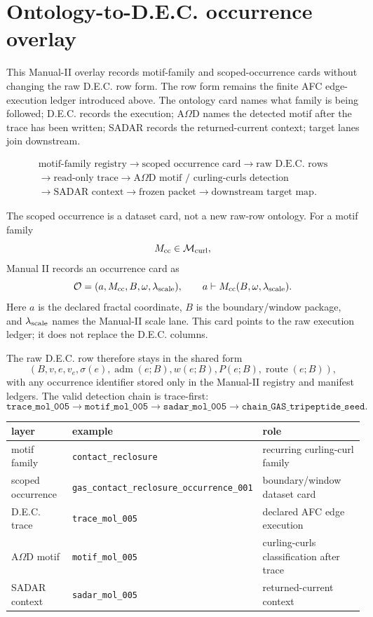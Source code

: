 
\section{Ontology-to-D.E.C. occurrence overlay}

This Manual-II overlay records motif-family and scoped-occurrence cards without changing the raw D.E.C. row form. The row form remains the finite AFC edge-execution ledger introduced above. The ontology card names what family is being followed; D.E.C. records the execution; A$\Omega$D names the detected motif after the trace has been written; SADAR records the returned-current context; target lanes join downstream.

\[
\begin{array}{c}
\text{motif-family registry}\to\text{scoped occurrence card}\to\text{raw D.E.C. rows}\\[0.25em]
\to\text{read-only trace}\to\text{A$\Omega$D motif / curling-curls detection}\\[0.25em]
\to\text{SADAR context}\to\text{frozen packet}\to\text{downstream target map}.
\end{array}
\]

The scoped occurrence is a dataset card, not a new raw-row ontology. For a motif family
\[
M_{\rm cc}\in\mathcal M_{\rm curl},
\]
Manual II records an occurrence card as
\[
\mathcal O=(a,M_{\rm cc},B,\omega,\lambda_{\rm scale}),
\qquad
 a\vdash M_{\rm cc}(B,\omega,\lambda_{\rm scale}).
\]
Here $a$ is the declared fractal coordinate, $B$ is the boundary/window package, and $\lambda_{\rm scale}$ names the Manual-II scale lane. This card points to the raw execution ledger; it does not replace the D.E.C. columns.

The raw D.E.C. row therefore stays in the shared form
\[
(B,v,e,v_e,\sigma(e),\operatorname{adm}(e;B),w(e;B),P(e;B),\operatorname{route}(e;B)),
\]
with any occurrence identifier stored only in the Manual-II registry and manifest ledgers. The valid detection chain is trace-first:
\[
\texttt{trace\_mol\_005}
\rightarrow
\texttt{motif\_mol\_005}
\rightarrow
\texttt{sadar\_mol\_005}
\rightarrow
\texttt{chain\_GAS\_tripeptide\_seed}.
\]

\begin{center}\small
\begin{tabular}{lll}
\toprule
layer & example & role\\
\midrule
motif family & \texttt{contact\_reclosure} & recurring curling-curl family\\
scoped occurrence & \texttt{gas\_contact\_reclosure\_occurrence\_001} & boundary/window dataset card\\
D.E.C. trace & \texttt{trace\_mol\_005} & declared AFC edge execution\\
A$\Omega$D motif & \texttt{motif\_mol\_005} & curling-curls classification after trace\\
SADAR context & \texttt{sadar\_mol\_005} & returned-current context\\
\bottomrule
\end{tabular}
\end{center}

